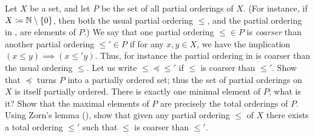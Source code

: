 \begin{ex}\label{i:ex:8.5.16}
  Let \(X\) be a set, and let \(P\) be the set of all partial orderings of \(X\).
  (For instance, if \(X \coloneqq \mathbb{N} \setminus \left\lbrace0\right\rbrace\), then both the usual partial ordering \(\leq\), and the partial ordering in , are elements of \(P\).)
  We say that one partial ordering \(\leq \in P\) is \emph{coarser} than another partial ordering \(\leq' \in P\) if for any \(x, y \in X\), we have the implication \((x \leq y) \implies (x \leq' y)\).
  Thus, for instance the partial ordering in  is coarser than the usual ordering \(\leq\).
  Let us write \(\leq \preceq \leq'\) if \(\leq\) is coarser than \(\leq'\).
  Show that \(\preceq\) turns \(P\) into a partially ordered set;
  thus the set of partial orderings on \(X\) is itself partially ordered.
  There is exactly one minimal element of \(P\);
  what is it?
  Show that the maximal elements of \(P\) are precisely the total orderings of \(P\).
  Using Zorn's lemma (), show that given any partial ordering \(\leq\) of \(X\) there exists a total ordering \(\leq'\) such that \(\leq\) is coarser than \(\leq'\).
\end{ex}

